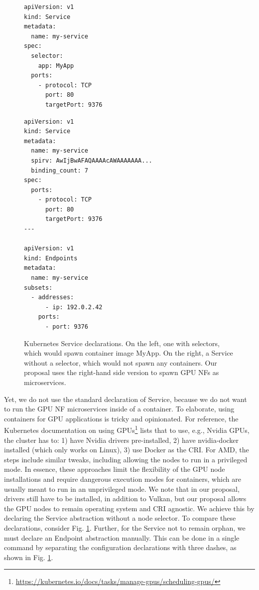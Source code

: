 \documentclass{IEEEtran}
\begin{document}
\begin{figure}
\begin{minipage}[t]{0.45\columnwidth}
\begin{lstlisting}
apiVersion: v1
kind: Service
metadata:
  name: my-service
spec:
  selector:
    app: MyApp
  ports:
    - protocol: TCP
      port: 80
      targetPort: 9376
\end{lstlisting} 
\end{minipage}
\begin{minipage}[t]{0.45\columnwidth}
\begin{lstlisting}
apiVersion: v1
kind: Service
metadata:
  name: my-service
  spirv: AwIjBwAFAQAAAAcAWAAAAAAA...
  binding_count: 7
spec:
  ports:
    - protocol: TCP
      port: 80
      targetPort: 9376
---

apiVersion: v1
kind: Endpoints
metadata:
  name: my-service
subsets:
  - addresses:
      - ip: 192.0.2.42
    ports:
      - port: 9376
\end{lstlisting} 
\end{minipage}
\caption{Kubernetes Service declarations. On the left, one with selectors, which would spawn container image MyApp. On the right, a Service without a selector, which would not spawn any containers. Our proposal uses the right-hand side version to spawn GPU NFs as microservices.}
\label{fig:svc}
\end{figure}

Yet, we do not use the standard declaration of Service, because we do not want to run the GPU NF microservices inside of a container. To elaborate, using containers for GPU applications is tricky and opinionated. For reference, the Kubernetes documentation on using GPUs\footnote{\url{https://kubernetes.io/docs/tasks/manage-gpus/scheduling-gpus/}} lists that to use, e.g., Nvidia GPUs, the cluster has to: 1) have Nvidia drivers pre-installed, 2) have nvidia-docker installed (which only works on Linux), 3) use Docker as the CRI. For AMD, the steps include similar tweaks, including allowing the nodes to run in a privileged mode. In essence, these approaches limit the flexibility of the GPU node installations and require dangerous execution modes for containers, which are usually meant to run in an unprivileged mode. We note that in our proposal, drivers still have to be installed, in addition to Vulkan, but our proposal allows the GPU nodes to remain operating system and CRI agnostic. We achieve this by declaring the Service abstraction without a node selector. To compare these declarations, consider Fig. \ref{fig:svc}. Further, for the Service not to remain orphan, we must declare an Endpoint abstraction manually. This can be done in a single command by separating the configuration declarations with three dashes, as shown in Fig. \ref{fig:svc}.
\end{document}
